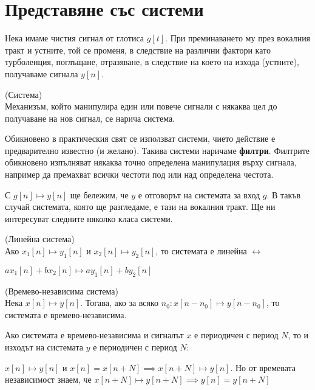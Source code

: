 \documentclass[main.tex]{subfiles}
\begin{document}
\section{Представяне със системи}
Нека имаме чистия сигнал от глотиса $g[t]$. При преминаването му през вокалния тракт и устните, той
се променя, в следствие на различни фактори като турболенция, поглъщане, отразяване, в следствие на което 
на изхода (устните), получаваме сигнала $y[n]$.

\begin{definition*}{(Система)}\\
Механизъм, който манипулира един или повече сигнали с някаква цел до
получаване на нов сигнал, се нарича система.

Обикновено в практическия свят се използват системи, чието действие е предварително известно (и желано). Такива системи
наричаме \textbf{филтри}. Филтрите обикновено изпълняват някаква точно определена манипулация върху сигнала, например
да премахват всички честоти под или над определена честота.
\end{definition*}

С $g[n] \mapsto y[n]$ ще бележим, че $y$ е отговорът на системата за вход $g$. В такъв случай системата, която ще разгледаме, е тази на вокалния тракт. Ще ни интересуват
следните няколко класа системи.

\begin{definition*}{(Линейна система)}\\
    Ако $x_1[n] \mapsto y_1[n]$ и $x_2[n] \mapsto y_2[n]$, то системата е линейна $\longleftrightarrow$

    $ax_1[n] + bx_2[n] \mapsto ay_1[n] + by_2[n]$ 
\end{definition*}


\begin{definition*}{(Времево-независима система)}\\
    Нека $x[n] \mapsto y[n]$. Тогава, ако за всяко $n_0: x[n - n_0] \mapsto y[n - n_0]$, то
    системата е времево-независима.
\end{definition*}

\begin{property}
\label{systems:periodicity}
Ако системата е времево-независима и сигналът $x$ е периодичен с период $N$,
то и изходът на системата $y$ е периодичен с период $N$:

$x[n] \mapsto y[n]$ и $x[n] = x[n+N] \implies x[n+N] \mapsto y[n]$. Но от времевата независимост знаем, че
$x[n+N] \mapsto y[n+N] \implies y[n] = y[n+N]$
\end{property}
\end{document}
